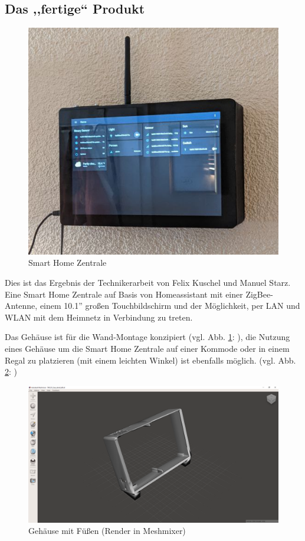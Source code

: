 \subsection{Das ,,fertige`` Produkt}\label{ku_produkt}
\begin{figure}[H]
	\includegraphics[width=1\textwidth]{img/fertiges_geraet.png}
	\caption[Smart Home Zentrale]{Smart Home Zentrale}
	\label{fig:smart-home-zentrale}
\end{figure}
\noindent Dies ist das Ergebnis der Technikerarbeit von Felix Kuschel und Manuel Starz. 
Eine Smart Home Zentrale auf Basis von Homeassistant mit einer ZigBee-Antenne, einem 10.1'' großen Touchbildschirm und der Möglichkeit, per LAN und WLAN mit dem Heimnetz in Verbindung zu treten.\par
\noindent Das Gehäuse ist für die Wand-Montage konzipiert (vgl. Abb. \ref{fig:smart-home-zentrale}: ), die Nutzung eines Gehäuse um die Smart Home Zentrale auf einer Kommode oder in einem Regal zu platzieren (mit einem leichten Winkel) ist ebenfalls möglich. (vgl. Abb. \ref{fig:case-with-feet}: )
\begin{figure}[H]
	\includegraphics[width=1\textwidth]{img/stand_case.png}
	\caption[Gehäuse mit Füßen (Render in Meshmixer)]{Gehäuse mit Füßen (Render in Meshmixer)}
	\label{fig:case-with-feet}
\end{figure}
